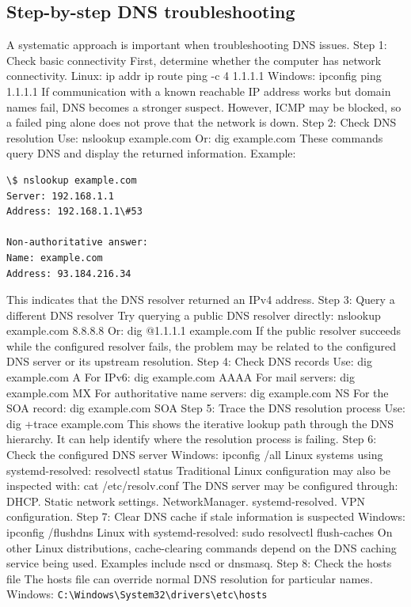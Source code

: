 \subsection{Step-by-step DNS troubleshooting}
A systematic approach is important when troubleshooting DNS issues.
Step 1: Check basic connectivity
First, determine whether the computer has network connectivity.
Linux:
ip addr ip route ping -c 4 1.1.1.1
Windows:
ipconfig ping 1.1.1.1
If communication with a known reachable IP address works but domain names fail, DNS becomes a stronger suspect.
However, ICMP may be blocked, so a failed ping alone does not prove that the network is down.
Step 2: Check DNS resolution
Use:
nslookup example.com
Or:
dig example.com
These commands query DNS and display the returned information.
Example:
\begin{lstlisting}
\$ nslookup example.com
Server: 192.168.1.1
Address: 192.168.1.1\#53

Non-authoritative answer:
Name: example.com
Address: 93.184.216.34
\end{lstlisting}
This indicates that the DNS resolver returned an IPv4 address.
Step 3: Query a different DNS resolver
Try querying a public DNS resolver directly:
nslookup example.com 8.8.8.8
Or:
dig @1.1.1.1 example.com
If the public resolver succeeds while the configured resolver fails, the problem may be related to the configured DNS server or its upstream resolution.
Step 4: Check DNS records
Use:
dig example.com A
For IPv6:
dig example.com AAAA
For mail servers:
dig example.com MX
For authoritative name servers:
dig example.com NS
For the SOA record:
dig example.com SOA
Step 5: Trace the DNS resolution process
Use:
dig +trace example.com
This shows the iterative lookup path through the DNS hierarchy.
It can help identify where the resolution process is failing.
Step 6: Check the configured DNS server
Windows:
ipconfig /all
Linux systems using systemd-resolved:
resolvectl status
Traditional Linux configuration may also be inspected with:
cat /etc/resolv.conf
The DNS server may be configured through:
DHCP.
Static network settings.
NetworkManager.
systemd-resolved.
VPN configuration.
Step 7: Clear DNS cache if stale information is suspected
Windows:
ipconfig /flushdns
Linux with systemd-resolved:
sudo resolvectl flush-caches
On other Linux distributions, cache-clearing commands depend on the DNS caching service being used.
Examples include nscd or dnsmasq.
Step 8: Check the hosts file
The hosts file can override normal DNS resolution for particular names.
Windows:
\texttt{C:\textbackslash{}Windows\textbackslash{}System32\textbackslash{}drivers\textbackslash{}etc\textbackslash{}hosts}
